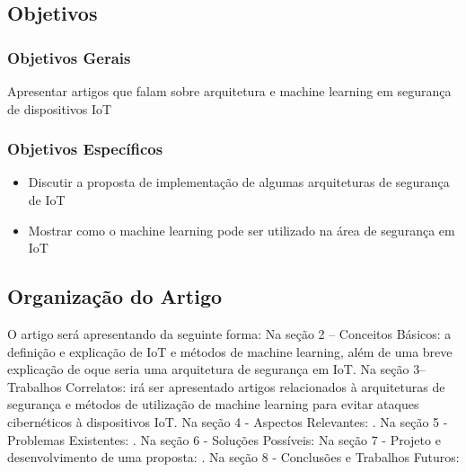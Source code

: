 \documentclass[article]{abntex2}
\begin{document}
\subsection{Objetivos}
\subsubsection{Objetivos Gerais}
Apresentar artigos que falam sobre arquitetura e machine learning em segurança de dispositivos IoT
\subsubsection{Objetivos Específicos}
\begin{itemize}
    \item Discutir a proposta de implementação de algumas arquiteturas de segurança de IoT
    \item Mostrar como o machine learning pode ser utilizado na área de segurança em IoT
\end{itemize}
\subsection{Organização do Artigo}
O artigo será apresentando da seguinte forma: Na seção 2 – Conceitos Básicos: a definição e explicação de IoT e métodos de machine learning, além de uma breve explicação de oque seria uma arquitetura de segurança em IoT. Na seção 3– Trabalhos Correlatos: irá ser apresentado artigos relacionados à arquiteturas de segurança e métodos de utilização de machine learning para evitar ataques cibernéticos à dispositivos IoT. Na seção 4 - Aspectos Relevantes: . Na seção 5 - Problemas Existentes: . Na seção 6 - Soluções Possíveis: Na seção 7 - Projeto e desenvolvimento de uma proposta: . Na seção 8 - Conclusões e Trabalhos Futuros:
\end{document}
